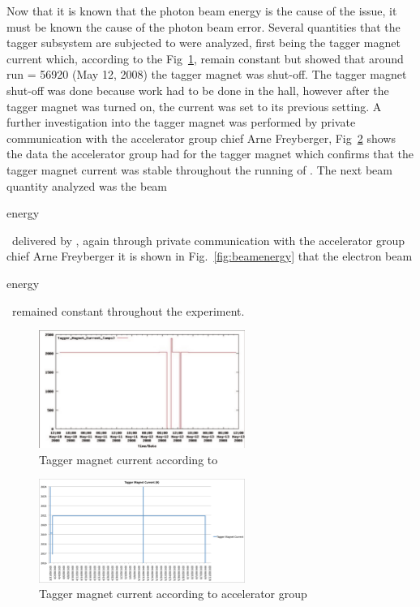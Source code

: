 Now that it is known that the photon beam energy is the cause of the issue, it must be known the cause of the photon beam error. Several quantities that the tagger subsystem are subjected to were analyzed, first being the tagger magnet current which, according to the  Fig~\ref{fig:tag.magnet.epics}, remain constant
but showed that around run = 56920 (May 12, 2008) the tagger magnet was shut-off. The tagger magnet shut-off was done because work had to be done in the hall, however after the tagger magnet was turned on, the current was set to its previous setting. A further investigation into the tagger magnet was performed by private communication with the accelerator group chief Arne Freyberger, Fig~\ref{fig:tag.magnet.arne} shows the data the accelerator group had for the tagger magnet which confirms that the tagger magnet current was stable throughout the running of . The next beam quantity analyzed was the beam \begin{v2}energy\end{v2}\ delivered by , again through private communication with the accelerator group chief Arne Freyberger it is shown in Fig.~\ref{fig:beamenergy} that the electron beam \begin{v2}energy\end{v2}\ remained constant throughout the  experiment.
\begin{figure}\begin{center}
\includegraphics[width=0.6\textwidth]{figures/calib/tag/ecor/600px-Hystersis_smokingGun.pdf}
\caption[Current of Tagger Magnet from ]{\label{fig:tag.magnet.epics}Tagger magnet current according to }
\end{center}\end{figure}

\begin{figure}\begin{center}
\includegraphics[width=0.6\textwidth]{figures/calib/tag/ecor/tagger_current_arne.eps}
\caption[Current of Tagger Magnet from Accelerator Group]{\label{fig:tag.magnet.arne} Tagger magnet current according to accelerator group}
\end{center}\end{figure}

